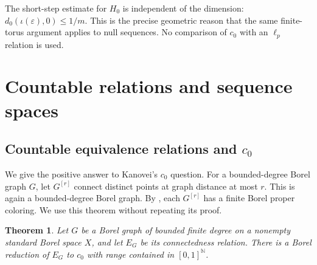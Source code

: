 \documentclass[11pt]{article}
\numberwithin{equation}{section}
\newtheorem{theorem}{Theorem}[section]
\theoremstyle{definition}
\newcommand{\N}{\mathbb N}
\begin{document}
The short-step estimate for $H_0$ is independent of the dimension:
$d_0(\iota(\varepsilon),0)\le1/m$. This is the precise geometric reason
that the same finite-torus argument applies to null sequences. No
comparison of $c_0$ with an $\ell_p$ relation is used.

\section{Countable relations and sequence spaces}\label{sec:countable-sequences}
\subsection{Countable equivalence relations and \texorpdfstring{$c_0$}{c0}}
We give the positive answer to Kanovei's $c_0$ question.
For a bounded-degree Borel graph $G$, let $G^{[r]}$ connect distinct
points at graph distance at most $r$. This is again a bounded-degree
Borel graph. By \cite[Proposition~4.6]{KST}, each $G^{[r]}$ has a
finite Borel proper coloring. We use this theorem without repeating
its proof.
\begin{theorem}\label{thm:countable-graph-czero}
Let $G$ be a Borel graph of bounded finite degree on a nonempty standard
Borel space $X$, and let $E_G$ be its connectedness relation. There is a
Borel reduction of $E_G$ to $c_0$ with range contained in $[0,1]^{\N}$.
\end{theorem}
\end{document}
